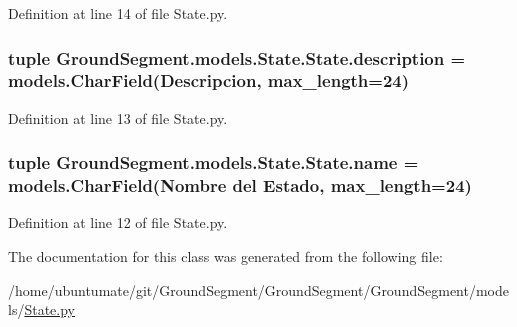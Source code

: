 Definition at line 14 of file State.\+py.

\hypertarget{class_ground_segment_1_1models_1_1_state_1_1_state_a95d135c5695095cfbd949dd4076556e7}{}
\subsubsection[{description}]{\setlength{\rightskip}{0pt plus 5cm}tuple Ground\+Segment.\+models.\+State.\+State.\+description = models.\+Char\+Field(\textquotesingle{}Descripcion\textquotesingle{}, max\+\_\+length=24)\hspace{0.3cm}{\ttfamily [static]}}\label{class_ground_segment_1_1models_1_1_state_1_1_state_a95d135c5695095cfbd949dd4076556e7}


Definition at line 13 of file State.\+py.

\hypertarget{class_ground_segment_1_1models_1_1_state_1_1_state_a86dbd0b52a7eb954d59b33f4a29fb718}{}
\subsubsection[{name}]{\setlength{\rightskip}{0pt plus 5cm}tuple Ground\+Segment.\+models.\+State.\+State.\+name = models.\+Char\+Field(\textquotesingle{}Nombre del Estado\textquotesingle{}, max\+\_\+length=24)\hspace{0.3cm}{\ttfamily [static]}}\label{class_ground_segment_1_1models_1_1_state_1_1_state_a86dbd0b52a7eb954d59b33f4a29fb718}


Definition at line 12 of file State.\+py.



The documentation for this class was generated from the following file\+:\begin{DoxyCompactItemize}
\item 
/home/ubuntumate/git/\+Ground\+Segment/\+Ground\+Segment/\+Ground\+Segment/models/\hyperlink{_state_8py}{State.\+py}\end{DoxyCompactItemize}
